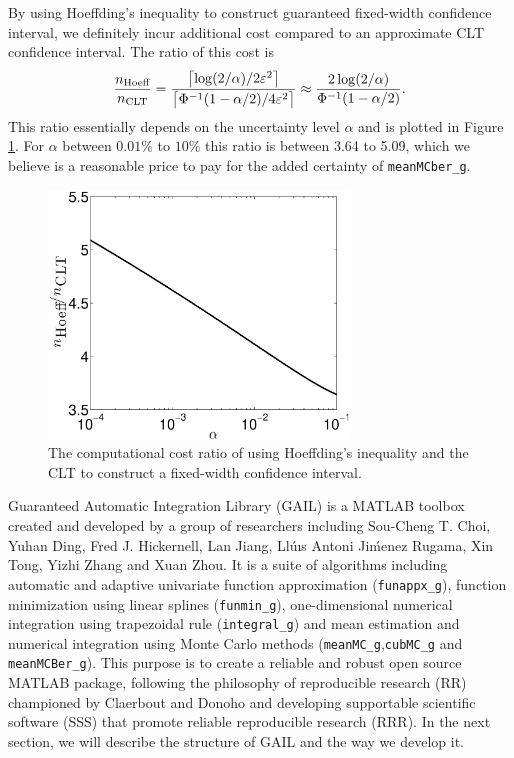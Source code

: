 \documentclass{iitthesis}
\theoremstyle{definition}
\begin{document}
By using Hoeffding's inequality to construct guaranteed fixed-width confidence interval, we definitely incur additional cost compared to an approximate CLT confidence interval.  The ratio of this cost is 
\begin{equation}
\frac{n_{\text{Hoeff}}}{n_{\text{CLT}}} = \frac{\left \lceil \log(2/\alpha)/{2\varepsilon^2} \right \rceil}{\left \lceil{ \Phi^{-1}(1-\alpha/2)}/{4 \varepsilon^2}\right\rceil} \approx  \frac{2\log(2/\alpha)}{\Phi^{-1}(1-\alpha/2)}.
\end{equation}
This ratio essentially depends on the uncertainty level $\alpha$ and is plotted in Figure \ref{fig:ratiovsalpha}. For $\alpha$ between $0.01\%$ to $10\%$ this ratio is between 3.64 to 5.09, which we believe is a reasonable price to pay for the added certainty of {\tt meanMCber\_g}.

  \begin{figure}[htbp]
    \centering
    \includegraphics[width=8cm]{plotHoeffCLTr.eps} %
    \caption{The computational cost ratio of using Hoeffding's inequality and the CLT to construct a fixed-width confidence interval.}
    \label{fig:ratiovsalpha}
 \end{figure}
 
 
Guaranteed Automatic Integration Library (GAIL) \cite{GAIL_2_1} is a MATLAB toolbox created and developed by a group of researchers including Sou-Cheng T. Choi, Yuhan Ding, Fred J. Hickernell, Lan Jiang, Ll\'{u}ıs Antoni Ji\'{m}enez Rugama, Xin Tong, Yizhi Zhang and Xuan Zhou. It is a suite of algorithms including automatic and adaptive univariate function approximation ({\tt funappx\_g}), function minimization using linear splines ({\tt funmin\_g}), one-dimensional numerical integration using trapezoidal rule ({\tt integral\_g}) and mean estimation and numerical integration using Monte Carlo methods ({\tt meanMC\_g},{\tt cubMC\_g} and {\tt meanMCBer\_g}). This purpose is to create a reliable and robust open source MATLAB package, following the philosophy of reproducible research (RR) championed by Claerbout \cite{Claerbout10} and Donoho\cite{BuckheitDonoho95} and developing supportable scientific software (SSS) that promote reliable reproducible research (RRR). In the next section, we will describe the structure of GAIL and the way we develop it.
\end{document}
